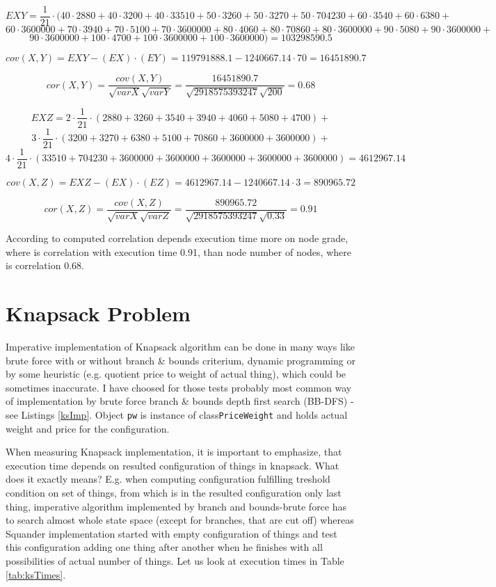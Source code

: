 \documentclass[11pt,twoside,a4paper]{book}
\begin{document}
$$EXY= \frac{1}{21}\cdot(40\cdot 2 880 + 40\cdot 3 200  + 40\cdot 33510 +
50 \cdot  3 260+ 50 \cdot   3 270+ 50 \cdot   704230 +60 \cdot   3 540 +60\cdot  
6 380+$$ $$60 \cdot   3600000  +70\cdot 
3 940 +70\cdot  5 100 +70\cdot  3600000 +80\cdot  4 060
+80\cdot 70 860 +80\cdot  3600000+90\cdot  5
080 +90\cdot  3 600 000 +$$ $$90\cdot  3600000 +100\cdot  4 700
+100\cdot  3 600 000 +100\cdot  3600000)=103298590.5$$

$$cov\left(X,Y\right)=EXY-\left(EX\right)\cdot \left(EY\right)=119791888.1
-1240667.14\cdot 70= 16451890.7$$

$$cor(X,Y)=\frac{cov(X,Y)}{\sqrt{varX}\sqrt{varY}}=\frac{16451890.7}{\sqrt{2918575393247}\sqrt{200}}=0.68$$

$$EXZ=2\cdot\frac{1}{21}\cdot\left(2880 + 3260 + 3 540 + 3 940 + 4 060 + 5 080 
+ 4 700\right)+$$
$$3\cdot\frac{1}{21}\cdot\left(3 200  + 3 270  + 6 380  + 5 100 + 70 860  + 3
600 000 + 3 600 000\right)+$$
$$4\cdot\frac{1}{21}\cdot\left(33 510   + 704 230   + 3600000  + 3600000 + 3600000 
+ 3 600 000 + 3 600 000\right) = 4612967.14$$

$$cov\left(X,Z\right)=EXZ-\left(EX\right)\cdot \left(EZ\right)=4612967.14
-1240667.14\cdot 3=890965.72$$

$$cor(X,Z)=\frac{cov(X,Z)}{\sqrt{varX}\sqrt{varZ}}=\frac{890965.72}{\sqrt{2918575393247}\sqrt{0.33}}=0.91$$

According to computed correlation depends execution time more on node grade,
where is correlation with execution time 0.91, than node number of nodes, where
is correlation 0.68.
\newpage
\section{Knapsack Problem}

Imperative implementation of Knapsack algorithm can be done in many ways like
brute force with or without branch \& bounds criterium, dynamic programming or
by some heuristic (e.g. quotient price to weight of actual thing), which could
be sometimes inaccurate. I have choosed for those tests probably most common way
of implementation by brute force branch \& bounds depth first search (BB-DFS) -
see Listings \ref{ksImp}. Object \verb|pw| is instance of
class\verb|PriceWeight| and holds actual weight and price for the configuration.



When measuring Knapsack implementation, it is important to emphasize, that
execution time depends on resulted configuration of things in knapsack. What
does it exactly means? E.g. when computing configuration fulfilling treshold
condition on set of things, from which is in the resulted configuration only
last thing, imperative algorithm implemented by branch and
bounds-brute force has to search almost whole state space (except for branches,
that are cut off) whereas Squander implementation started with empty
configuration of things and test this configuration adding one thing after
another when he finishes with all possibilities of actual number of things. Let
us look at execution times in Table \ref{tab:ksTimes}.
\end{document}
